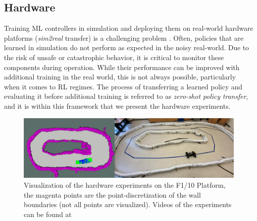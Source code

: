 \documentclass[manuscript,screen,review]{acmart}
\begin{document}
\subsection{Hardware}
Training ML controllers in simulation and deploying them on real-world hardware platforms (\textit{sim2real} transfer) is a challenging problem \cite{jang2019ICCPS, kadian2019we}. Often, policies that are learned in simulation do not perform as expected in the noisy real-world. Due to the risk of unsafe or catastrophic behavior, it is critical to monitor these components during operation. While their performance can be improved with additional training in the real world, this is not always possible, particularly when it comes to RL regimes. The process of transferring a learned policy and evaluating it before additional training is referred to as \emph{zero-shot policy transfer}, and it is within this framework that we present the hardware experiments.

\begin{figure}[bthp]%
  \centering
  \includegraphics[width=\linewidth]{figures/sidebyside_comparison.pdf}
  \caption{Visualization of the hardware experiments on the F1/10 Platform, the magenta points are the point-discretization of the wall boundaries (not all points are visualized). Videos of the experiments can be found at}
  \label{fig:lab_setup}
\end{figure}%
\end{document}
